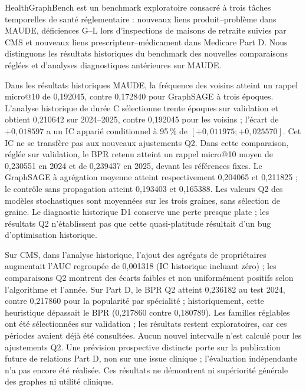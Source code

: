 HealthGraphBench est un benchmark exploratoire consacré à trois tâches temporelles de santé réglementaire : nouveaux liens produit--problème dans MAUDE, déficiences G--L lors d'inspections de maisons de retraite suivies par CMS et nouveaux liens prescripteur--médicament dans Medicare Part D. Nous distinguons les résultats historiques du benchmark des nouvelles comparaisons réglées et d'analyses diagnostiques antérieures sur MAUDE.

Dans les résultats historiques MAUDE, la fréquence des voisins atteint un rappel micro@10 de 0,192045, contre 0,172840 pour GraphSAGE à trois époques. L'analyse historique de durée C sélectionne trente époques sur validation et obtient 0,210642 sur 2024--2025, contre 0,192045 pour les voisins ; l'écart de $+0,018597$ a un IC apparié conditionnel à 95\,\% de $[+0,011975;+0,025570]$. Cet IC ne se transfère pas aux nouveaux ajustements Q2. Dans cette comparaison, réglée sur validation, le BPR retenu atteint un rappel micro@10 moyen de 0,230551 en 2024 et de 0,239437 en 2025, devant les références fixes. Le GraphSAGE à agrégation moyenne atteint respectivement 0,204065 et 0,211825 ; le contrôle sans propagation atteint 0,193403 et 0,165388. Les valeurs Q2 des modèles stochastiques sont moyennées sur les trois graines, sans sélection de graine. Le diagnostic historique D1 conserve une perte presque plate ; les résultats Q2 n'établissent pas que cette quasi-platitude résultait d'un bug d'optimisation historique.

Sur CMS, dans l'analyse historique, l'ajout des agrégats de propriétaires augmentait l'AUC regroupée de 0,001318 (IC historique incluant zéro) ; les comparaisons Q2 montrent des écarts faibles et non uniformément positifs selon l'algorithme et l'année. Sur Part D, le BPR Q2 atteint 0,236182 au test 2024, contre 0,217860 pour la popularité par spécialité ; historiquement, cette heuristique dépassait le BPR (0,217860 contre 0,180789). Les familles réglables ont été sélectionnées sur validation ; les résultats restent exploratoires, car ces périodes avaient déjà été consultées. Aucun nouvel intervalle n'est calculé pour les ajustements Q2. Une prévision prospective distincte porte sur la publication future de relations Part D, non sur une issue clinique ; l'évaluation indépendante n'a pas encore été réalisée. Ces résultats ne démontrent ni supériorité générale des graphes ni utilité clinique.
